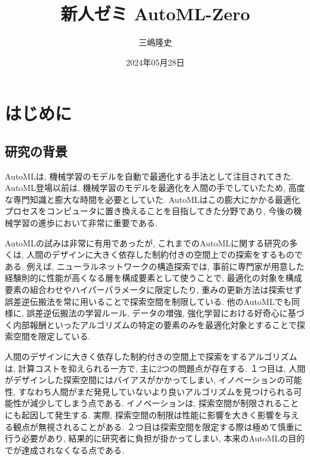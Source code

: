 \documentclass[11pt,oneside,openany,report]{jsbook}
\title{新人ゼミ AutoML-Zero}
\author{三嶋隆史}
\date{2024年05月28日}
\begin{document}
\maketitle
%
%


\tableofcontents

\chapter{はじめに}\label{chap:intr}

\section{研究の背景}\label{chap:intr:backgroud}

AutoMLは, 機械学習のモデルを自動で最適化する手法として注目されてきた. AutoML登場以前は, 機械学習のモデルを最適化を人間の手でしていたため, 高度な専門知識と膨大な時間を必要としていた. AutoMLはこの膨大にかかる最適化プロセスをコンピュータに置き換えることを目指してきた分野であり\cite{Fahlman_1989}\cite{Hutter_2011}\cite{Finn_2017}, 今後の機械学習の進歩において非常に重要である.

AutoMLの試みは非常に有用であったが, これまでのAutoMLに関する研究の多くは, 人間のデザインに大きく依存した制約付きの空間上での探索をするものである. 例えば, ニューラルネットワークの構造探索では, 事前に専門家が用意した経験則的に性能が高くなる層を構成要素として使うことで, 最適化の対象を構成要素の組合わせやハイパーパラメータに限定したり, 重みの更新方法は探索せず誤差逆伝搬法を常に用いることで探索空間を制限している\cite{Zoph_2016}\cite{Real_2019}\cite{Tan_2019}. 他のAutoMLでも同様に, 誤差逆伝搬法の学習ルール, データの増強, 強化学習における好奇心に基づく内部報酬といったアルゴリズムの特定の要素のみを最適化対象とすることで探索空間を限定している\cite{Andrychowicz_2016}\cite{Cubuk_2019}\cite{Alet_2020}.

人間のデザインに大きく依存した制約付きの空間上で探索をするアルゴリズムは, 計算コストを抑えられる一方で, 主に2つの問題点が存在する. １つ目は, 人間がデザインした探索空間にはバイアスがかかってしまい, イノベーションの可能性, すなわち人間がまだ発見していないより良いアルゴリズムを見つけられる可能性が減少してしまう点である. イノベーションは, 探索空間が制限されることにも起因して発生する\cite{Elsken_2019}. 実際, 探索空間の制限は性能に影響を大きく影響を与える観点が無視されることがある\cite{Yang_2019}. ２つ目は探索空間を限定する際は極めて慎重に行う必要があり\cite{Zoph_2018}\cite{So_2019}\cite{Negrinho_2019}, 結果的に研究者に負担が掛かってしまい, 本来のAutoMLの目的でが達成されなくなる点である.
\end{document}
